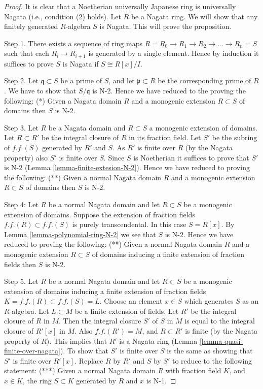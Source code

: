 \begin{proof}
It is clear that a Noetherian universally Japanese ring is universally
Nagata (i.e., condition (2) holds). Let $R$ be a Nagata ring.
We will show that any finitely generated $R$-algebra $S$ is Nagata.
This will prove the proposition.

\medskip\noindent
Step 1. There exists a sequence of ring maps
$R = R_0 \to R_1 \to R_2 \to \ldots \to R_n = S$ such that
each $R_i \to R_{i + 1}$ is generated by a single element.
Hence by induction it suffices to prove $S$ is Nagata if
$S \cong R[x]/I$.

\medskip\noindent
Step 2. Let $\mathfrak q \subset S$ be a prime of $S$, and let
$\mathfrak p \subset R$ be the corresponding prime of $R$.
We have to show that $S/\mathfrak q$ is N-2. Hence we have
reduced to the proving the following:
(*) Given a Nagata domain $R$ and a monogenic extension $R \subset S$
of domains then $S$ is N-2.

\medskip\noindent
Step 3. Let $R$ be a Nagata domain and $R \subset S$ a monogenic
extension of domains. Let $R \subset R'$ be the integral closure
of $R$ in its fraction field. Let $S'$ be the subring of
$f.f.(S)$ generated by $R'$ and $S$. As $R'$ is finite over $R$
(by the Nagata property) also $S'$ is finite over $S$.
Since $S$ is Noetherian it suffices to prove that $S'$
is N-2 (Lemma \ref{lemma-finite-extesion-N-2}).
Hence we have reduced to proving the following:
(**) Given a normal Nagata domain $R$ and a
monogenic extension $R \subset S$ of domains then $S$ is N-2.

\medskip\noindent
Step 4: Let $R$ be a normal Nagata domain and
let $R \subset S$ be a monogenic extension of domains.
Suppose the extension of fraction fields $f.f.(R) \subset f.f.(S)$
is purely transcendental. In this case $S = R[x]$. By
Lemma \ref{lemma-polynomial-ring-N-2} we see that $S$ is N-2.
Hence we have reduced to proving the following:
(**) Given a normal Nagata domain $R$ and a
monogenic extension $R \subset S$ of domains
inducing a finite extension of fraction fields
then $S$ is N-2.

\medskip\noindent
Step 5. Let $R$ be a normal Nagata domain and
let $R \subset S$ be a monogenic extension of domains
inducing a finite extension of fraction fields
$K = f.f.(R) \subset f.f.(S) = L$. Choose an element $x \in S$
which generates $S$ as an $R$-algebra. Let $L \subset M$
be a finite extension of fields.
Let $R'$ be the integral closure of $R$ in $M$.
Then the integral closure $S'$ of $S$ in $M$ is equal to the integral
closure of $R'[x]$ in $M$.
Also $f.f.(R') = M$, and $R \subset R'$
is finite (by the Nagata property of $R$).
This implies that $R'$ is a Nagata ring
(Lemma \ref{lemma-quasi-finite-over-nagata}).
To show that $S'$ is finite over $S$ is the same as showing that
$S'$ is finite over $R'[x]$. Replace $R$ by $R'$ and $S$ by $S'$
to reduce to the following statement:
(***) Given a normal Nagata domain $R$ with fraction field $K$,
and $x \in K$, the ring $S \subset K$ generated by $R$ and $x$
is N-1.


\end{proof}
